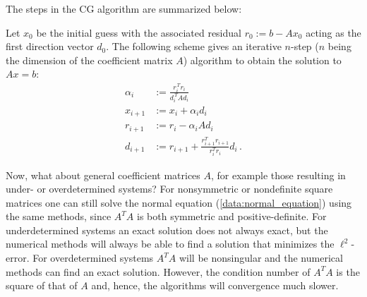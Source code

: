     The steps in the CG algorithm are summarized below:
    \begin{method}
        Let $x_0$ be the initial guess with the associated residual $r_0:=b-Ax_0$ acting as the first direction vector $d_0$. The following scheme gives an iterative $n$-step ($n$ being the dimension of the coefficient matrix $A$) algorithm to obtain the solution to $Ax=b$:
        \begin{align}
            \alpha_i &:= \frac{r_i^{\,T}r_i}{d_i^{\,T}\!Ad_i}\\
            x_{i+1} &:= x_i+\alpha_id_i\\
            r_{i+1} &:= r_i-\alpha_iAd_i\label{data:residual_recurrence}\\
            d_{i+1} &:= r_{i+1}+\frac{r_{i+1}^Tr_{i+1}}{r_i^Tr_i}d_i\,.\label{data:beta}
        \end{align}
    \end{method}


    Now, what about general coefficient matrices $A$, for example those resulting in under- or overdetermined systems? For nonsymmetric or nondefinite square matrices one can still solve the normal equation (\cref{data:normal_equation}) using the same methods, since $A^T\!A$ is both symmetric and positive-definite. For underdetermined systems an exact solution does not always exact, but the numerical methods will always be able to find a solution that minimizes the $\ell^2$-error. For overdetermined systems $A^T\!A$ will be nonsingular and the numerical methods can find an exact solution. However, the condition number of $A^T\!A$ is the square of that of $A$ and, hence, the algorithms will convergence much slower.

